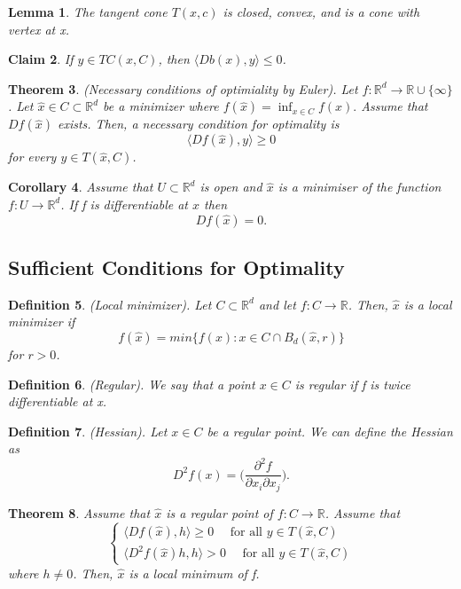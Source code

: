 \documentclass[twoside]{article}
\newcounter{lecnum}
\newtheorem{theorem}{Theorem}[lecnum]
\newtheorem{lemma}[theorem]{Lemma}
\newtheorem{claim}[theorem]{Claim}
\newtheorem{corollary}[theorem]{Corollary}
\newtheorem{definition}[theorem]{Definition}
\begin{document}
\begin{lemma}The tangent cone $T(x,c)$ is closed, convex, and is a cone with vertex at x.
\end{lemma}

\begin{claim}If $y \in TC(x, C)$, then $\langle Db(x), y \rangle \leq 0$.
\end{claim}

\begin{theorem}(Necessary conditions of optimiality by Euler). Let $f: \mathbb{R}^d \rightarrow \mathbb{R} \cup \{\infty\}$. Let $\hat{x} \in C \subset \mathbb{R}^d$ be a minimizer where
$
f(\hat{x}) = \inf_{x \in C}f(x).
$
Assume that $Df(\hat{x})$ exists. Then, a necessary condition for optimality is
$$
\langle Df(\hat{x}), y \rangle \geq 0
$$
for every $y \in T(\hat{x}, C)$.
\end{theorem}

\begin{corollary}Assume that $U \subset \mathbb{R}^d$ is open and $\hat{x}$ is a minimiser of the function $f: U \rightarrow \mathbb{R}^d$. If f is differentiable at $\hat{x}$ then 
$$
Df(\hat{x}) = 0.
$$
\end{corollary}

\subsection{Sufficient Conditions for Optimality}

\begin{definition}(Local minimizer). Let $C \subset \mathbb{R}^d$ and let $f: C \rightarrow \mathbb{R}$. Then, $\hat{x}$ is a local minimizer if
$$
f(\hat{x}) = min\{f(x): x \in C \cap B_d(\hat{x}, r)\}
$$
for $r > 0$.
\end{definition}

\begin{definition}(Regular). We say that a point $x \in C$ is regular if f is twice differentiable at x.
\end{definition}

\begin{definition}(Hessian). Let $x \in C$ be a regular point. We can define the Hessian as
$$
D^2f(x) = \big(\frac{\partial^2f}{\partial x_i \partial x_j} \big).
$$
\end{definition}

\begin{theorem}Assume that $\hat{x}$ is a regular point of $f: C \rightarrow \mathbb{R}$. Assume that
$$
\begin{cases}
\langle Df(\hat{x}), h \rangle \geq 0 \quad \text{ for all } y \in T(\hat{x},C) \\
\langle D^2f(\hat{x})h, h \rangle > 0 \quad \text{ for all } y \in T(\hat{x}, C)
\end{cases}
$$
where $h \neq 0$. Then, $\hat{x}$ is a local minimum of f.
\end{theorem}
\end{document}

